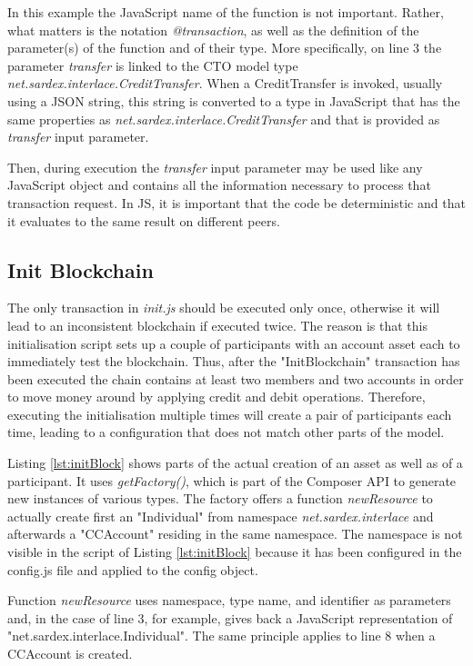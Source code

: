In this example the JavaScript name of the function is not important. Rather, what matters is the notation \textit{@transaction}, as well as the definition of the parameter(s) of the function and of their type. More specifically, on line 3 the parameter \textit{transfer} is linked to the CTO model type \textit{net.sardex.interlace.CreditTransfer}. When a CreditTransfer is invoked, usually using a JSON string, this string is converted to a type in JavaScript that has the same properties as \textit{net.sardex.interlace.CreditTransfer} and that is provided as \textit{transfer} input parameter.

Then, during execution the \textit{transfer} input parameter may be used like any JavaScript object and contains all the information necessary to process that transaction request. In JS, it is important that the code be deterministic and that it evaluates to the same result on different peers.

\subsection{Init Blockchain}
\label{subsec:initblockchain}

The only transaction in \textit{init.js} should be executed only once, otherwise it will lead to an inconsistent blockchain if executed twice. The reason is that this initialisation script sets up a couple of participants with an account asset each to immediately test the blockchain. Thus, after the "InitBlockchain" transaction has been executed the chain contains at least two members and two accounts in order to move money around by applying credit and debit operations. Therefore, executing the initialisation multiple times will create a pair of participants each time, leading to a configuration that does not match other parts of the model.

Listing \ref{lst:initBlock} shows parts of the actual creation of an asset as well as of a participant. It uses \textit{getFactory()}, which is part of the Composer API to generate new instances of various types. The factory offers a function \textit{newResource} to actually create first an "Individual" from namespace \textit{net.sardex.interlace} and afterwards a "CCAccount" residing in the same namespace. The namespace is not visible in the script of Listing \ref{lst:initBlock} because it has been configured in the config.js file and applied to the config object.

Function \textit{newResource} uses namespace, type name, and identifier as parameters and, in the case of line 3, for example, gives back a JavaScript representation of "net.sardex.interlace.Individual". The same principle applies to line 8 when a CCAccount is created.

